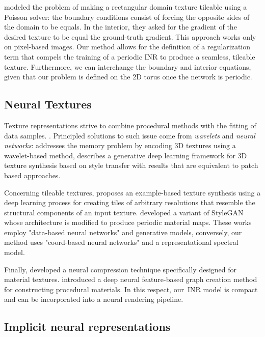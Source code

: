 \citet{perez2023poisson} modeled the problem of making a rectangular domain texture tileable using a Poisson solver: the boundary conditions consist of forcing the opposite sides of the domain to be equals. In the interior, they asked for the gradient of the desired texture to be equal the ground-truth gradient.
This approach works only on pixel-based images.
Our method allows for the definition of a regularization term that compels the training of a periodic INR to produce a seamless, tileable texture. Furthermore, we can interchange the boundary and interior equations, given that our problem is defined on the 2D torus once the network is periodic.


\subsection{Neural Textures}
Texture representations strive to combine procedural methods with the fitting of data samples. .
Principled solutions to such issue come from \emph{wavelets} and \emph{neural networks}: \citet{BAJAJ-2000} addresses the memory problem by encoding 3D textures using a wavelet-based method, \citet{Gutierrez-2019} describes a generative deep learning framework for 3D texture synthesis based on style transfer with results that are equivalent to patch based approaches.

Concerning tileable textures, \citet{deeptile} proposes an example-based texture synthesis using a deep learning process for creating tiles of arbitrary resolutions that resemble the structural components of an input texture.
\citet{zhou2022tilegen} developed a variant of StyleGAN whose architecture is modified to produce periodic material maps.
These works employ "data-based neural networks" and generative models, conversely, our method uses "coord-based neural networks" and a representational spectral model.

Finally, \citet{ntc2023}
developed a neural compression technique specifically designed for material textures. \citet{match}
introduced a deep neural feature-based graph creation method for constructing procedural materials.
In this respect, our~INR model is compact and can be incorporated into a neural rendering pipeline.

\subsection{Implicit neural representations}

